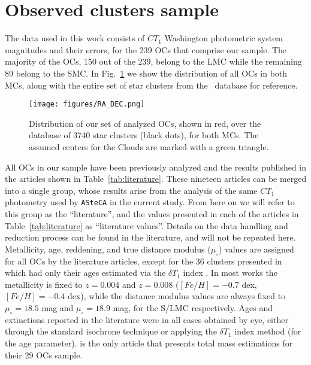 \documentclass{aa}
\begin{document}

\section{Observed clusters sample}
\label{sec:clust-sample}

The data used in this work consists of $CT_1$ Washington photometric system
magnitudes and their errors, for the 239 OCs that comprise our sample.
The majority of the OCs, 150 out of the 239, belong to the LMC while the
remaining 89 belong to the SMC.
%
In Fig.~\ref{fig:ra-dec} we show the distribution of all OCs in both MCs,
along with the entire set of star clusters from the~\cite{Bica_2008} database
for reference.

\begin{figure}
\centering
\texttt{[image: figures/RA\_DEC.png]}
\caption{Distribution of our set of analyzed OCs, shown in red, over the~\cite
{Bica_2008} database of 3740 star clusters (black dots), for both MCs. The
assumed centers for the Clouds are marked with a green triangle.}
\label{fig:ra-dec}
\end{figure}

All OCs in our sample have been previously analyzed and the results published in
the articles shown in Table~\ref{tab:literature}.
These nineteen articles can be merged into a single group, whose results
arise from the analysis of the same $CT_1$ photometry used by \texttt{ASteCA} in the
current study. From here on we will refer to this group as the ``literature'',
and the values presented in each of the articles in Table~\ref{tab:literature}
as ``literature values''.
Details on the data handling and reduction process can be found in the
literature, and will not be repeated here.
%
Metallicity, age, reddening, and true distance modulus ($\mu_{\circ}$) values
are assigned for all OCs by the literature articles, except for the 36 clusters
presented in~\cite{Piatti_2011b} which had only their ages estimated via the
$\delta T_1$ index \citep{Phelps_1994,Geisler_1997}.
In most works the metallicity is fixed to $z{=}0.004$ and $z{=}0.008$
($[Fe/H]{=}-0.7$ dex, $[Fe/H]{=}-0.4$ dex), while the distance modulus values
are always fixed to $\mu_{\circ}{=}18.5$ mag and $\mu_{\circ}{=}18.9$ mag, for
the S/LMC respectively.
Ages and extinctions reported in the literature were in all cases obtained by
eye, either through the standard isochrone technique or applying the
$\delta T_1$ index method (for the age parameter).
%
\cite{Maia_2013} is the only article that presents total mass estimations for
their 29 OCs sample.
\end{document}
